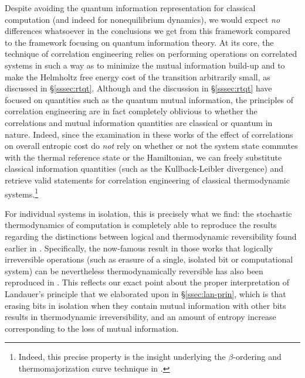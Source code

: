 \documentclass[preprints,article,accept,moreauthors,pdftex]{Definitions/mdpi}
\begin{document}
\begin{paracol}{2}
Despite avoiding the quantum information representation for classical computation (and indeed for nonequilibrium dynamics), we would expect \emph{no} differences whatsoever in the conclusions we get from this framework compared to the framework focusing on quantum information theory. At its core, the technique of correlation engineering \cite{Fra18,Mueller18} relies on performing operations on correlated systems in such a way as to minimize the mutual information build-up and to make the Helmholtz free energy cost of the transition arbitrarily small, as discussed in \S\ref{sssec:rtqt}. Although \cite{Fra18,Mueller18} and the discussion in \S\ref{sssec:rtqt} have focused on quantities such as the quantum mutual information, the principles of correlation engineering are in fact completely oblivious to whether the correlations and mutual information quantities are classical or quantum in nature. Indeed, since the examination in these works of the effect of correlations on overall entropic cost do \emph{not} rely on whether or not the system state commutes with the thermal reference state or the Hamiltonian, we can freely substitute classical information quantities (such as the Kullback-Leibler divergence) and retrieve valid statements for correlation engineering of classical thermodynamic systems.\footnote{Indeed, this precise property is the insight underlying the $\beta$-ordering and thermomajorization curve technique in \cite{HO13}.}

For individual systems in isolation, this is precisely what we find: the stochastic thermodynamics of computation is completely able to reproduce the results regarding the distinctions between logical and thermodynamic reversibility found earlier in \cite{Ben73,Ben82,Ben03,Sagawa13}. Specifically, the now-famous result in those works that logically irreversible operations (such as erasure of a single, isolated bit or computational system) can be nevertheless thermodynamically reversible has also been reproduced in \cite{Wol19a,Wol19b}. This reflects our exact point about the proper interpretation of Landauer’s principle that we elaborated upon in \S\ref{ssec:lan-prin}, which is that erasing bits in isolation when they contain mutual information with other bits results in thermodynamic irreversibility, and an amount of entropy increase corresponding to the loss of mutual information.


\end{paracol}
\end{document}
